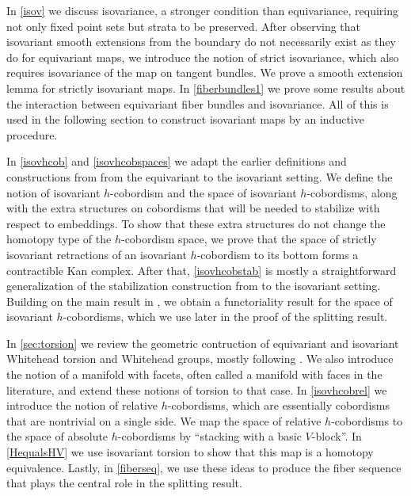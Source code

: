 \documentclass[11pt]{amsart}
\theoremstyle{definition}
\numberwithin{equation}{section}
\numberwithin{figure}{section}
\begin{document}
In \autoref{isov} we discuss isovariance, a stronger condition than equivariance, requiring not only fixed point sets but  strata to be preserved. After observing that isovariant smooth extensions from the boundary do not necessarily exist as they do for equivariant maps, we introduce the notion of strict isovariance, which also requires isovariance of the map on tangent bundles. We prove a smooth extension lemma for strictly isovariant maps.  In \autoref{fiberbundles1} we prove some results about the interaction between equivariant fiber bundles and isovariance. All of this is used in the following section to construct isovariant maps by an inductive procedure.
 
 In \autoref{isovhcob} and \autoref{isovhcobspaces} we adapt the earlier definitions and constructions from \cite{GIMM1} from the equivariant to the isovariant setting. %
 We define the notion of isovariant $h$-cobordism and the space of isovariant $h$-cobordisms, along with the extra structures on cobordisms that will be needed to stabilize with respect to embeddings. To show that these extra structures do not change the homotopy type of the $h$-cobordism space, we prove that the space of strictly isovariant retractions of an isovariant $h$-cobordism to its bottom forms a contractible Kan complex.
After that, \autoref{isovhcobstab} is mostly a straightforward generalization of the stabilization construction from \cite{GIMM1} to the isovariant setting. Building on the main result in \cite{GIMM1}, we obtain a functoriality result for the space of isovariant $h$-cobordisms, which we use later in the proof of the splitting result. 
 
 
 In \autoref{sec:torsion} we review the geometric contruction of equivariant and isovariant Whitehead torsion and Whitehead groups, mostly following \cite{luck}. We also introduce the notion of a manifold with facets, often called a manifold with faces in the literature, and extend these notions of torsion to that case. In \autoref{isovhcobrel} we introduce the notion of relative $h$-cobordisms, which are essentially cobordisms that are nontrivial on a single side. We map the space of relative $h$-cobordisms to the space of absolute $h$-cobordisms by ``stacking with a basic $V$-block''. In \autoref{HequalsHV} we use isovariant torsion to show that this map is a homotopy equivalence. Lastly, in \autoref{fiberseq}, we use these ideas to produce the fiber sequence that plays the central role in the splitting result.
  
\end{document}

